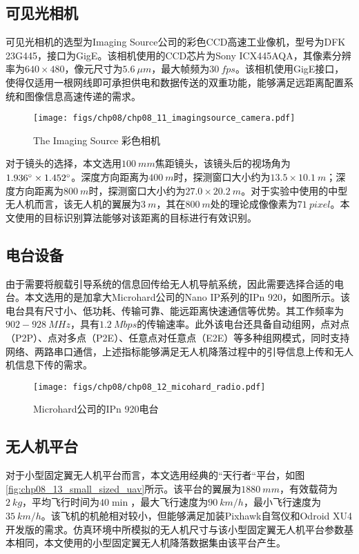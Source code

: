 \subsection{可见光相机}
可见光相机的选型为Imaging Source公司的彩色CCD高速工业像机，型号为DFK 23G445，接口为GigE。该相机使用的CCD芯片为Sony ICX445AQA，其像素分辨率为$640\times480$，像元尺寸为$5.6\  \mu m$，最大帧频为$30\ fps$。该相机使用GigE接口，使得仅适用一根网线即可承担供电和数据传送的双重功能，能够满足远距离配置系统和图像信息高速传递的需求。

\begin{figure}[!ht]
	\centering
	\texttt{[image: figs/chp08/chp08\_11\_imagingsource\_camera.pdf]}	
	\caption{The Imaging Source 彩色相机}
	\label{fig:chp08_11_imagingsource_camera}
\end{figure}

对于镜头的选择，本文选用$100\ mm$焦距镜头，该镜头后的视场角为$1.936\degree \times 1.452 \degree$。深度方向距离为$400\ m$时，探测窗口大小约为$13.5\times10.1\ m$；深度方向距离为$800\ m$时，探测窗口大小约为$27.0\times20.2\ m$。对于实验中使用的中型无人机而言，该无人机的翼展为$3\ m$，其在$800\ m$处的理论成像像素为$71\ pixel$。本文使用的目标识别算法能够对该距离的目标进行有效识别。

\subsection{电台设备}	
由于需要将舰载引导系统的信息回传给无人机导航系统，因此需要选择合适的电台。本文选用的是加拿大Microhard公司的Nano IP系列的IPn 920，如图所示。该电台具有尺寸小、低功耗、传输可靠、能远距离快速通信等优势。其工作频率为$902-928\ MHz$，具有$1.2\ Mbps$的传输速率。此外该电台还具备自动组网，点对点（P2P）、点对多点（P2E）、任意点对任意点（E2E）等多种组网模式，同时支持网络、两路串口通信，上述指标能够满足无人机降落过程中的引导信息上传和无人机信息下传的需求。

\begin{figure}[!ht]
	\centering
	\texttt{[image: figs/chp08/chp08\_12\_micohard\_radio.pdf]}	
	\caption{Microhard公司的IPn 920电台}
	\label{fig:chp08_12_micohard_radio}
\end{figure}

\subsection{无人机平台}

对于小型固定翼无人机平台而言，本文选用经典的“天行者“平台，如图\ref{fig:chp08_13_small_sized_uav}所示。该平台的翼展为$1880\ mm$，有效载荷为$2\ kg$，平均飞行时间为$40 \min$，最大飞行速度为$90\ km/h$，最小飞行速度为$35\ km/h$。该飞机的机舱相对较小，但能够满足加装Pixhawk自驾仪和Odroid XU4开发版的需求。仿真环境中所模拟的无人机尺寸与该小型固定翼无人机平台参数基本相同，本文使用的小型固定翼无人机降落数据集由该平台产生。

